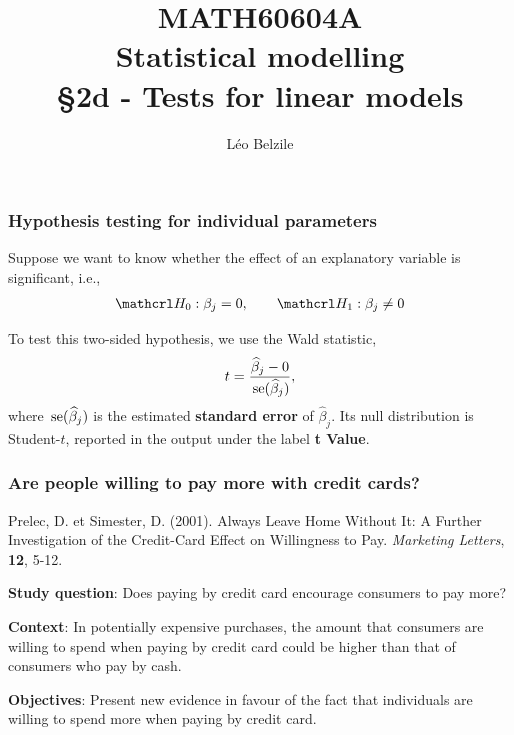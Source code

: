 \documentclass{beamer}
\title[\color{white}{MATH60604A Tests for linear models}]{\texorpdfstring{MATH60604A \\Statistical modelling \\ \S 2d - Tests for linear models}{MATH60604A \\Statistical modelling \\ \S~2d - Tests for linear models}}
\author{Léo Belzile}
\institute{HEC Montréal\\
Department of Decision Sciences}
\date{}
\begin{document}
\frame{\titlepage}


 \begin{frame}
\frametitle{Hypothesis testing for individual parameters}
\bi
\item Suppose we want to know whether the effect of an explanatory variable is significant, i.e.,
\begin{align*}
\Hy_0: \beta_j=0,  \qquad  \Hy_1: \beta_j\neq 0
\end{align*}
\item To test this two-sided hypothesis, we use the Wald statistic,
\begin{align*}
t=\frac{\widehat{\beta}_j-0}{\,\mathrm{se}(\widehat{\beta}_j)}, 
\end{align*}
where $\,\mathrm{se}(\widehat{\beta}_j)$ is the estimated \textbf{standard error} of $\widehat{\beta}_j$. Its null distribution is Student-$t$, reported in the \SASlang output under the label \textbf{t Value}.
\ei
\end{frame}


\begin{frame}
\frametitle{Are people willing to pay more with credit cards?}

\begin{tcolorbox}[colback=lightgray!30!white,colframe=lightgray!75!black,title=Reference]
Prelec, D. et Simester, D. (2001). Always Leave Home Without It: A Further Investigation of the Credit-Card Effect on Willingness to Pay. \textit{Marketing Letters}, \textbf{12}, 5-12.
\end{tcolorbox}
\bi
\item \alert{\textbf{Study question}}: Does paying by credit card encourage consumers to pay more?
\item \textbf{Context}: In potentially expensive purchases, the amount that consumers are willing to spend when paying by credit card could be higher than that of consumers who pay by cash.
\item \textbf{Objectives}:  Present new evidence in favour of the fact that individuals are willing to spend more when paying by credit card. 
\ei
\end{frame}
\end{document}
